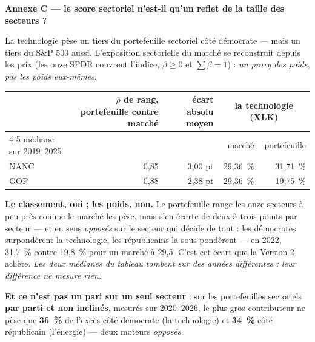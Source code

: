 \documentclass[9pt,a4paper]{extarticle}
\begin{document}
\vspace{0.8mm}
{\color{bleu}\bfseries Annexe C --- le score sectoriel n'est-il qu'un reflet de la taille des secteurs ?}\par
\vspace{0.6mm}
{\footnotesize
La technologie pèse un tiers du portefeuille sectoriel côté démocrate --- mais un tiers du S\&P 500 aussi.
L'exposition sectorielle du marché se reconstruit depuis les prix (les onze SPDR couvrent l'indice, $\beta \ge 0$
et $\sum\beta = 1$) : \emph{un proxy des poids, pas les poids eux-mêmes}.\par}
\vspace{0.4mm}
{\centering\scriptsize\setlength{\tabcolsep}{5pt}
\begin{tabular}{@{}l r r r r@{}}
\toprule
 & $\rho$ de rang, portefeuille contre marché & écart absolu moyen & \multicolumn{2}{c}{la technologie (XLK)} \\
\cmidrule(lr){4-5}
médiane sur 2019--2025 & & & marché & portefeuille \\
\midrule
NANC & 0,85 & 3,00 pt & 29,36~\% & 31,71~\% \\
GOP & 0,88 & 2,38 pt & 29,36~\% & 19,75~\% \\
\bottomrule
\end{tabular}\par}
\vspace{0.4mm}
{\footnotesize
\textbf{Le classement, oui ; les poids, non.} Le portefeuille range les onze secteurs à peu près comme le
marché les pèse, mais s'en écarte de deux à trois points par secteur --- et en sens \emph{opposés} sur le
secteur qui décide de tout : les démocrates surpondèrent la technologie, les républicains la
sous-pondèrent --- en 2022, 31,7~\% contre 19,8~\% pour un marché à 29,5. C'est cet écart que la Version 2
achète. \emph{Les deux médianes du tableau tombent sur des années différentes : leur différence ne mesure
rien.}\par
\vspace{0.4mm}
\textbf{Et ce n'est pas un pari sur un seul secteur} : sur les portefeuilles sectoriels \textbf{par parti et non inclinés}, mesurés sur 2020--2026, le plus gros contributeur ne pèse que \textbf{36~\%} de
l'excès côté démocrate (la technologie) et \textbf{34~\%} côté républicain (l'énergie) --- deux moteurs
\emph{opposés}.\par}
\end{document}
